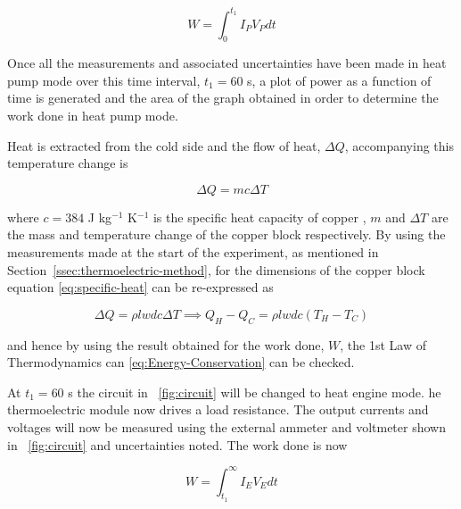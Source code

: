 \documentclass{article}
\newcommand{\figref}[2][\figurename~]{#1\ref{#2}}
\newcommand{\secref}[2][Section~]{#1\ref{#2}}
\begin{document}
\begin{equation}
\label{eq:pump-work}
W = \int_{0}^{t_1} I_P V_P dt
\end{equation}

\vspace{2mm}  
\noindent
Once all the measurements and associated uncertainties have been made in heat pump mode over this time interval, $t_1 = 60$ s, a plot of power as a function of time is generated and the area of the graph obtained in order to determine the work done in heat pump mode. 

\vspace{2mm}  
\noindent
Heat is extracted from the cold side and the flow of heat, $\Delta Q$, accompanying this temperature change is

\begin{equation}
\label{eq:specific-heat}
\Delta Q = mc\Delta T
\end{equation}

\vspace{2mm}  
\noindent
where $c = 384$ J kg$^{-1}$ K$^{-1}$ is the specific heat capacity of copper \cite{Paper02}, $m$ and $\Delta T$ are the mass and temperature change of the copper block respectively. By using the measurements made at the start of the experiment, as mentioned in \secref{ssec:thermoelectric-method}, for the dimensions of the copper block equation \eqref{eq:specific-heat} can be re-expressed as 

\begin{equation}
\label{eq:specific-heat1}
\Delta Q = \rho lwdc\Delta T \implies Q_H - Q_C = \rho lwdc(T_H - T_C)
\end{equation}

\vspace{2mm}  
\noindent
and hence by using the result obtained for the work done, $W$, the 1st Law of Thermodynamics can \eqref{eq:Energy-Conservation} can be checked.

\vspace{2mm}  
\noindent
At $t_1 = 60$ s the circuit in \figref{fig:circuit} will be changed to heat engine mode. he thermoelectric module now drives a load resistance. The output currents and voltages will now be measured using the external ammeter and voltmeter shown in \figref{fig:circuit} and uncertainties noted. The work done is now

\begin{equation}
\label{eq:engine-work}
W = \int_{t_1}^{\infty} I_E V_E dt
\end{equation}
\end{document}
